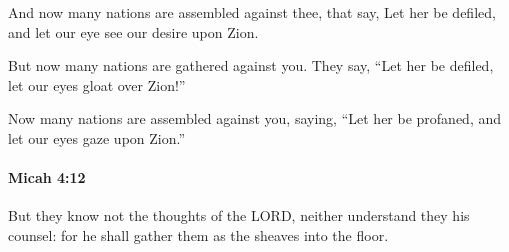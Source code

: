 			\begin{versebox}
					\item[BHS] 
					\item[LXX] 
					\item[ASV] And now many nations are assembled against thee, that say, Let her be defiled, and let our eye see our desire upon Zion.
					\item[NIV] But now many nations are gathered against you. They say, “Let her be defiled, let our eyes gloat over Zion!”
					\item[NRSV] Now many nations are assembled against you, saying, “Let her be profaned, and let our eyes gaze upon Zion.”
			\end{versebox}

		\paragraph{Micah 4:12} %
			\label{MICAH-4-12}

			But they know not the thoughts of the LORD, neither understand they his counsel: for he shall gather them as the sheaves into the floor.

